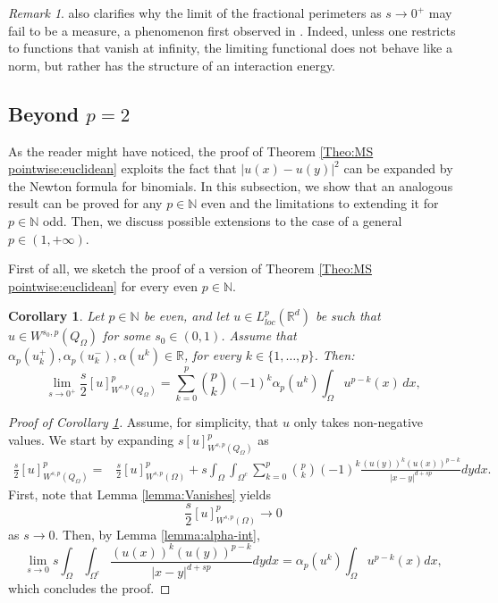 \documentclass[reqno,11pt]{amsart}
\numberwithin{equation}{section}
\theoremstyle{definition} %
\theoremstyle{plain}
\newtheorem{cor}[cor]{Corollary}
\theoremstyle{definition}
\theoremstyle{remark}
\newtheorem{remark}[remark]{Remark}
\def\Qom{{Q_\Omega}}
\def\O{\Omega}
\def\io{\int_\Omega}
\def\semin#1#2{ [#1 ]_{#2}}
\def\N{\mathbb{N}}
\def\R{\mathbb{R}}
\newcommand{\abs}[1]{\left|#1\right|}
\begin{document}
\begin{remark}
     also clarifies why the limit of the fractional perimeters as $s\to0^+$ may fail to be a measure, a phenomenon first observed in \cite{Quartet}. Indeed, unless one restricts to functions that vanish at infinity, the limiting functional does not behave like a norm, but rather has the structure of an interaction energy.
\end{remark}

\subsection{Beyond $p=2$} 
As the reader might have noticed, the proof of Theorem \ref{Theo:MS pointwise:euclidean} exploits the fact that $\abs{u(x)-u(y)}^2$ can be expanded by the Newton formula for binomials. In this subsection, we show that an analogous result can be proved for any $p\in\N$ even and the limitations to extending it for $p\in\N$ odd. Then, we discuss possible extensions to the case of a general $p\in(1,+\infty)$.

First of all, we sketch the proof of a version of Theorem \ref{Theo:MS pointwise:euclidean} for every even $p\in\N$.
\begin{cor}
\label{cor:p-even}
 \label{Theo:MS pointwise:euclidean-p-even}
    Let $p\in \N$ be even, and let $u\in L^p_{loc}(\R^d)$ be such that $u\in W^{s_0,p}(\Qom)$ for some ${s_0\in(0,1)}$.
    Assume that  $\alpha_p(u_k^+), \alpha_p(u_k^-), \alpha(u^k)\in \R$, for every $k\in\{1,\dots,p\}$.
    Then:
    \begin{equation}
        \label{Eq:intro:ExtMS:pw:eucl-p-even}
        \lim_{s\to 0^+}\frac{s}{2}[u]^p_{W^{s,p}(\Qom)}=\sum_{k=0}^{p}\binom{p}{k}(-1)^k\alpha_p(u^k)\int_\Omega u^{p-k}(x)\,dx,
    \end{equation}
\end{cor}

\begin{proof}[Proof of Corollary \ref{cor:p-even}]
Assume, for simplicity, that $u$ only takes non-negative values.
We start by expanding $s\semin{u}{W^{s,p}(Q_\Omega)}^p$ as
    \begin{equation}
    \begin{split}
        \frac{s}{2}\semin{u}{W^{s,p}(Q_\Omega)}^p=&\frac{s}{2}\semin{u}{W^{s,p}(\Omega)}^p
        +s\int_{\Omega}\int_{\Omega^c} \sum_{k=0}^p \binom{p}{k}(-1)^k \frac{(u(y))^k (u(x))^{p-k}}{|x-y|^{d+sp}}dydx. 
    \end{split}
    \end{equation}
First, note that Lemma \ref{lemma:Vanishes} yields
\[\frac{s}{2}[u]^p_{W^{s,p}(\O)}\to 0\]
as $s\to 0$. Then, by Lemma \ref{lemma:alpha-int},
\[
\lim_{s\to0}s\int_{\Omega}\int_{\Omega^c}\frac{(u(x))^k (u(y))^{p-k}}{|x-y|^{d+sp}}dydx=\alpha_p(u^k)\io u^{p-k}(x)dx,
\]
which concludes the proof.
\end{proof}
\end{document}

